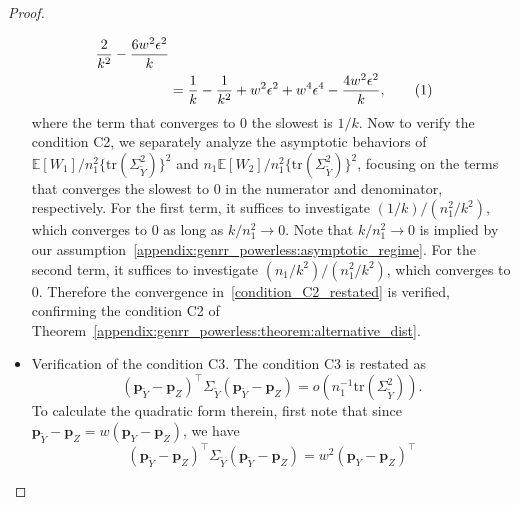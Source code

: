 \documentclass[twoside,11pt]{article}
\newcommand\numberthis{\addtocounter{equation}{1}\tag{\theequation}}
\newcommand{\rvTwo}{Y}
\newcommand{\rvThree}{Z}
\newcommand{\alphabetSize}{k} %
\newcommand{\sampleSize}{n}
\newcommand{\probVec}{\mathbf{p}} %
\begin{document}
\begin{appendix}
\begin{proof}
\begin{itemize}
\begin{align*}
				\frac{2}{\alphabetSize^2}
				-
				\frac{6w^2 \epsilon^2}{\alphabetSize}
				\\&=
				\frac{1}{\alphabetSize}
				-
				\frac{1}{\alphabetSize^2}
				+
				w^2 \epsilon^2
				+
				w^4 \epsilon^4
				-
				\frac{4w^2 \epsilon^2}{\alphabetSize},
				\numberthis
				\label{trace_calculation_plugged_in}
			\end{align*}
			where the term that converges to 0 the slowest is $1/k$.
			Now to verify the condition C2,
			we separately analyze the asymptotic behaviors of $\mathbb{E}[W_1]/\sampleSize_1^2
			\big\{
			\mathrm{tr}(\Sigma_{\tilde{\rvTwo}}^2)
			\big\}^2$
			and
			$\sampleSize_1
			\mathbb{E}[W_2]/\sampleSize_1^2
			\big\{
			\mathrm{tr}(\Sigma_{\tilde{\rvTwo}}^2)
			\big\}^2$,
			focusing on the terms that converges the slowest to $0$ in the numerator and denominator, respectively.
			For the first term, it suffices to investigate
			$(1/\alphabetSize)/(\sampleSize_1^2/\alphabetSize^2)$, which converges to 0
			as long as $\alphabetSize/\sampleSize_1^2 \to 0$.
			Note that $\alphabetSize/\sampleSize_1^2 \to 0$ is implied by our assumption~\eqref{appendix:genrr_powerless:asymptotic_regime}.
			For the second term, it suffices to investigate $(\sampleSize_1/\alphabetSize^2)/(\sampleSize_1^2/\alphabetSize^2)$, which converges to 0.
			Therefore the convergence in~\eqref{condition_C2_restated} is verified, 
			confirming the condition C2 of Theorem~\ref{appendix:genrr_powerless:theorem:alternative_dist}. 
			\item Verification of the condition C3.
			The condition C3 is restated as
			\begin{equation}\label{cond_c3_negative}
				(\probVec_{\tilde{\rvTwo}} - \probVec_\rvThree)^\top 
				\Sigma_{
					\tilde{
						{\rvTwo}
					}
				}
				(\probVec_{\tilde{\rvTwo}} - \probVec_\rvThree)
				=
				o\left(
				\sampleSize_1^{-1} \mathrm{tr}
				(\Sigma_{
					\tilde{{\rvTwo}}
				}^2)
				\right).
			\end{equation}
			To calculate the quadratic form therein, first note that since
			$
			\probVec_{\tilde{\rvTwo}}
			-
			\probVec_\rvThree
			=
			w(\probVec_\rvTwo- \probVec_\rvThree)
			$,
			we have
			\begin{equation*}%
				(\probVec_{\tilde{\rvTwo}} - \probVec_\rvThree)^\top 
				\Sigma_{
					\tilde{{\rvTwo}}
				}
				(\probVec_{\tilde{\rvTwo}} - \probVec_\rvThree)
				= %
				w^2
				(\probVec_\rvTwo - \probVec_\rvThree)^\top 

\end{equation*}
\end{itemize}
\end{proof}
\end{appendix}
\end{document}
